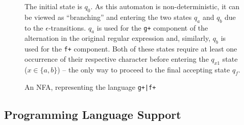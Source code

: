\documentclass[a4paper,openany,12pt]{book}
\begin{document}
\begin{figure}
    \begin{MyMdframed}
    \vspace{0.5em}
 

\caption{\label{figure:nfa:1} An NFA, representing the language \texttt{g+|f+}}
\vspace{0.5em}
\captionsetup{style=default}

        
\vspace{0.5em}

The initial state is $q_0$.
As this automaton is non-deterministic, it can be viewed as ``branching'' and entering the two states $q_a$ and $q_b$
due to the $\epsilon$-transitions.
$q_a$ is used for the \texttt{g+} component of the alternation in the original regular expression and, similarly, $q_b$
is used for the \texttt{f+} component.
Both of these states require at least one occurrence of their respective character before entering the $q_{x1}$ state
($x \in \{a, b\}$) -- the only way to proceed to the final accepting state $q_f$.

\vspace{0.5em}

\end{MyMdframed}
\end{figure}

\subsection{Programming Language Support}
\end{document}
